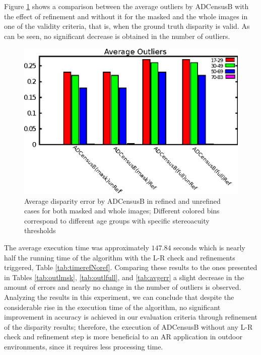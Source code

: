 Figure \ref{fig:outlnoref} shows a comparison between the average outliers by ADCensusB with the effect of refinement and without it for the masked and the whole images 
in one of the validity criteria, that is, when the ground truth disparity is valid. As can be seen, no significant decrease is obtained in the number of outliers.

\begin{figure}[H]
\centering
\includegraphics[scale=0.95]{adcrefNoref}
\caption{Average disparity error by ADCensusB in refined and unrefined cases for both masked and whole images; Different colored bins correspond to different age groups
with specific stereoacuity thresholds}
\label{fig:outlnoref}
\end{figure} 

The average execution time was approximately $147.84$ seconds which is nearly half the running time of the algorithm with the L-R check and refinements 
triggered, Table \ref{tab:timerefNoref}. 
Comparing these results to the ones presented in Tables \ref{tab:outlmsk}, \ref{tab:outlfull}, and \ref{tab:avgerr} a slight decrease in the amount of errors and 
nearly no change in the number of outliers is observed.
Analyzing the results in this experiment, we can conclude that despite the considerable rise in the execution time of the algorithm, no significant
improvement in accuracy is achieved in our evaluation criteria through refinement of the disparity results; therefore, the execution of ADCensusB without any L-R check and
refinement step is more beneficial to an AR application in outdoor environments, since it requires less processing time.\newline

